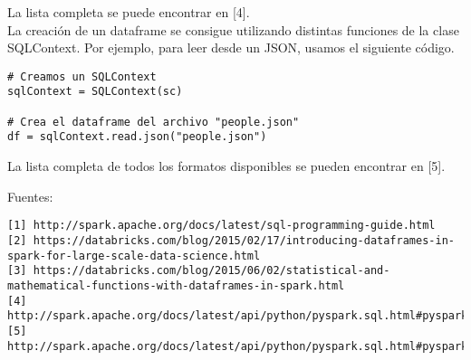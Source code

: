 \documentclass[12pt,a4paper,twoside,openright,titlepage,final]{article}
\begin{document}
La lista completa se puede encontrar en [4].\\

La creación de un dataframe se consigue utilizando distintas funciones de la clase SQLContext. Por ejemplo, para leer desde un JSON, usamos el siguiente código.

\begin{verbatim}
# Creamos un SQLContext
sqlContext = SQLContext(sc)

# Crea el dataframe del archivo "people.json"
df = sqlContext.read.json("people.json")
\end{verbatim}

La lista completa de todos los formatos disponibles se pueden encontrar en [5].


Fuentes:\\
\begin{verbatim}
[1] http://spark.apache.org/docs/latest/sql-programming-guide.html
[2] https://databricks.com/blog/2015/02/17/introducing-dataframes-in-spark-for-large-scale-data-science.html
[3] https://databricks.com/blog/2015/06/02/statistical-and-mathematical-functions-with-dataframes-in-spark.html
[4] http://spark.apache.org/docs/latest/api/python/pyspark.sql.html#pyspark.sql.DataFrame
[5] http://spark.apache.org/docs/latest/api/python/pyspark.sql.html#pyspark.sql.SQLContext
\end{verbatim}
\end{document}
